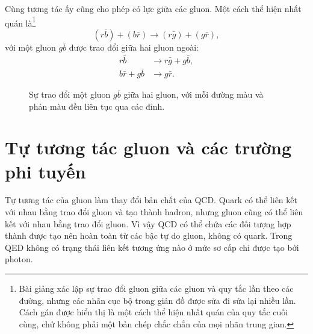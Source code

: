 Cùng tương tác ấy cũng cho phép có lực giữa các gluon. Một cách thể hiện nhất quán là\footnote{Bài giảng xác lập sự trao đổi gluon giữa các gluon và quy tắc lần theo các đường, nhưng các nhãn cục bộ trong giản đồ được sửa đi sửa lại nhiều lần. Cách gán được hiển thị là một cách thể hiện nhất quán của quy tắc cuối cùng, chứ không phải một bản chép chắc chắn của mọi nhãn trung gian.}
\begin{equation}
(r\bar b)+(b\bar r)
\longrightarrow
(r\bar g)+(g\bar r),
\end{equation}
với một gluon \(g\bar b\) được trao đổi giữa hai gluon ngoài:
\begin{align}
r\bar b&\longrightarrow r\bar g+g\bar b,\\
b\bar r+g\bar b&\longrightarrow g\bar r.
\end{align}

\begin{figure}[h]
\centering
{}
\caption{Sự trao đổi một gluon \(g\bar b\) giữa hai gluon, với mỗi đường màu và phản màu đều liên tục qua các đỉnh.}
\end{figure}

\section{Tự tương tác gluon và các trường phi tuyến}

Tự tương tác của gluon làm thay đổi bản chất của QCD. Quark có thể liên kết với nhau bằng trao đổi gluon và tạo thành hadron, nhưng gluon cũng có thể liên kết với nhau bằng trao đổi gluon. Vì vậy QCD có thể chứa các đối tượng hợp thành được tạo nên hoàn toàn từ các bậc tự do gluon, không có quark. Trong QED không có trạng thái liên kết tương ứng nào ở mức sơ cấp chỉ được tạo bởi photon.

